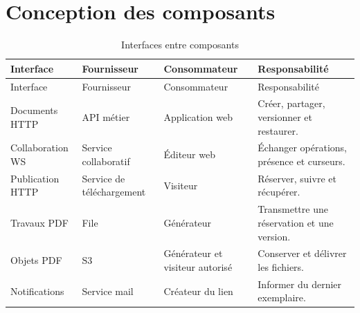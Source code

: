 \section{Conception des composants}

\begingroup\small\setlength{\tabcolsep}{3pt}\renewcommand{\arraystretch}{1.25}
\begin{longtable}{|P{.18\textwidth}|P{.24\textwidth}|P{.22\textwidth}|P{.27\textwidth}|}
\caption{Interfaces entre composants}\\
\hline
Interface & Fournisseur & Consommateur & Responsabilité \\ \hline
\endfirsthead
\hline
Interface & Fournisseur & Consommateur & Responsabilité \\ \hline
\endhead
\endfoot

Documents HTTP & API métier & Application web & Créer, partager, versionner et restaurer. \\ \hline

Collaboration WS & Service collaboratif & Éditeur web & Échanger opérations, présence et curseurs. \\ \hline

Publication HTTP & Service de téléchargement & Visiteur & Réserver, suivre et récupérer. \\ \hline

Travaux PDF & File & Générateur & Transmettre une réservation et une version. \\ \hline

Objets PDF & S3 & Générateur et visiteur autorisé & Conserver et délivrer les fichiers. \\ \hline

Notifications & Service mail & Créateur du lien & Informer du dernier exemplaire. \\ \hline

\end{longtable}\endgroup
